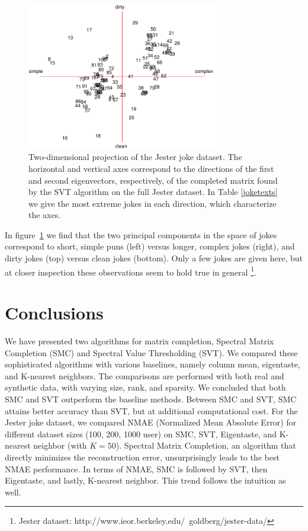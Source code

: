 \documentclass{article} %
\begin{document}
\begin{figure} [h]
\centering
\includegraphics[width = 0.75\textwidth]{jokes_2d_2.pdf}
\caption{Two-dimensional projection of the Jester joke dataset. The
  horizontal and vertical axes correspond to the directions of the
  first and second eigenvectors, respectively, of the completed matrix
  found by the SVT algorithm on the full Jester dataset. In Table
  \ref{joketexts} we give the most extreme jokes in each direction,
  which characterize the axes.}
\label{jokes2d}
\end{figure}

In figure~\ref{jokes2d} we find that the two principal components in
the space of jokes correspond to short, simple puns (left) versus
longer, complex jokes (right), and dirty jokes (top) versus clean
jokes (bottom). Only a few jokes are given here, but at closer
inspection these observations seem to hold true in general
\footnote{Jester dataset:
  http://www.ieor.berkeley.edu/~goldberg/jester-data/}.


\section{Conclusions}

We have presented two algorithms for matrix completion, Spectral
Matrix Completion (SMC) and Spectral Value Thresholding (SVT). We
compared these sophisticated algorithms with various baselines, namely
column mean, eigentaste, and K-nearest neighbors. The comparisons are
performed with both real and synthetic data, with varying size, rank,
and sparsity. We concluded that both SMC and SVT outperform the
baseline methods. Between SMC and SVT, SMC attains better accuracy
than SVT, but at additional computational cost. For the Jester joke
dataset, we compared NMAE (Normalized Mean Absolute Error) for
different dataset sizes ({100, 200, 1000} user) on SMC, SVT,
Eigentaste, and K-nearest neighbor (with $K=50$). Spectral Matrix
Completion, an algorithm that directly minimizes the reconstruction
error, unsurprisingly leads to the best NMAE performance. In terms of
NMAE, SMC is followed by SVT, then Eigentaste, and lastly, K-nearest
neighbor. This trend follows the intuition as well.
\end{document}

